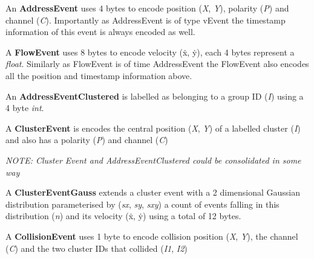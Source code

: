 An {\bfseries Address\-Event} uses 4 bytes to encode position ({\itshape X}, {\itshape Y}), polarity ({\itshape P}) and channel ({\itshape C}). Importantly as Address\-Event is of type v\-Event the timestamp information of this event is always encoded as well. \begin{DoxyVerb}
\end{DoxyVerb}


A {\bfseries Flow\-Event} uses 8 bytes to encode velocity (ẋ, ẏ), each 4 bytes represent a {\itshape float}. Similarly as Flow\-Event is of time Address\-Event the Flow\-Event also encodes all the position and timestamp information above. \begin{DoxyVerb}
\end{DoxyVerb}


An {\bfseries Address\-Event\-Clustered} is labelled as belonging to a group I\-D ({\itshape I}) using a 4 byte {\itshape int}. \begin{DoxyVerb}
\end{DoxyVerb}


A {\bfseries Cluster\-Event} is encodes the central position ({\itshape X}, {\itshape Y}) of a labelled cluster ({\itshape I}) and also has a polarity ({\itshape P}) and channel ({\itshape C}) \begin{DoxyVerb}
\end{DoxyVerb}


{\itshape N\-O\-T\-E\-: Cluster Event and Address\-Event\-Clustered could be consolidated in some way}

A {\bfseries Cluster\-Event\-Gauss} extends a cluster event with a 2 dimensional Gaussian distribution parameterised by ({\itshape sx}, {\itshape sy}, {\itshape sxy}) a count of events falling in this distribution ({\itshape n}) and its velocity (ẋ, ẏ) using a total of 12 bytes. \begin{DoxyVerb}
\end{DoxyVerb}


A {\bfseries Collision\-Event} uses 1 byte to encode collision position ({\itshape X}, {\itshape Y}), the channel ({\itshape C}) and the two cluster I\-Ds that collided ({\itshape I1}, {\itshape I2}) \begin{DoxyVerb}
\end{DoxyVerb}


